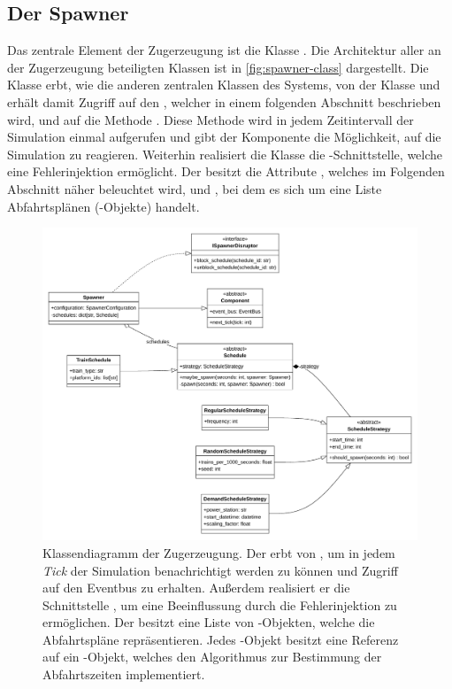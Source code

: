 \subsection{Der Spawner}

Das zentrale Element der Zugerzeugung ist die Klasse . Die Architektur aller an der Zugerzeugung beteiligten Klassen ist in \autoref{fig:spawner-class} dargestellt. Die Klasse  erbt, wie die anderen zentralen Klassen des Systems, von der Klasse  und erhält damit Zugriff auf den , welcher in einem folgenden Abschnitt beschrieben wird, und auf die Methode . Diese Methode wird in jedem Zeitintervall der Simulation einmal aufgerufen und gibt der Komponente die Möglichkeit, auf die Simulation zu reagieren. Weiterhin realisiert die Klasse  die -Schnittstelle, welche eine Fehlerinjektion \cite{persitzky_fehlerinjektion_2023} ermöglicht. Der  besitzt die Attribute , welches im Folgenden Abschnitt näher beleuchtet wird, und , bei dem es sich um eine Liste Abfahrtsplänen (-Objekte) handelt.

\begin{figure}[!ht]
	\centering
	\includegraphics[width=1.0\linewidth]{images/diagrams/spawner-class.pdf}
	\caption{Klassendiagramm der Zugerzeugung. Der  erbt von , um in jedem \emph{Tick} der Simulation benachrichtigt werden zu können und Zugriff auf den Eventbus zu erhalten. Außerdem realisiert er die Schnittstelle , um eine Beeinflussung durch die Fehlerinjektion zu ermöglichen. Der  besitzt eine Liste von -Objekten, welche die Abfahrtspläne repräsentieren. Jedes -Objekt besitzt eine Referenz auf ein -Objekt, welches den Algorithmus zur Bestimmung der Abfahrtszeiten implementiert.}
	\label{fig:spawner-class}
\end{figure}

